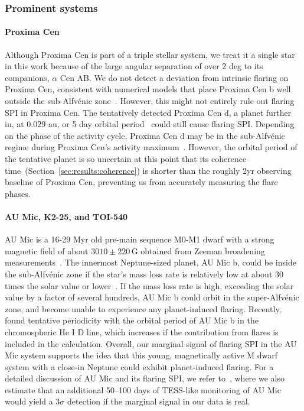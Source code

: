 \documentclass[twocolumn]{aastex631}
\begin{document}
\subsubsection{Prominent systems}
\label{sec:prominensystems}
\paragraph{Proxima Cen}
\label{sec:results:individualstars:proxima}
Although Proxima Cen is part of a triple stellar system, we treat it a single star in this work because of the large angular separation of over 2 deg to its companions, $\alpha$ Cen AB. We do not detect a deviation from intrinsic flaring on Proxima Cen, consistent with numerical models that place Proxima Cen b well outside the sub-Alfv\'enic zone~\citep{alvarado-gomez2020earthlike, kavanagh2021planetinduced, garraffo2022revisiting}. However, this might not entirely rule out flaring SPI in Proxima Cen. The tentatively detected Proxima Cen d, a planet further in, at 0.029 au, or 5 day orbital period~\citep{faria2022candidate, artigau2022linebyline} could still cause flaring SPI. Depending on the phase of the activity cycle, Proxima Cen d may be in the sub-Alfv\'enic regime during Proxima Cen's activity maximum~\citep{alvarado-gomez2020earthlike}. However, the orbital period of the tentative planet is so uncertain at this point that its coherence time~(Section~\ref{sec:results:coherence}) is shorter than the roughly 2yr observing baseline of Proxima Cen, preventing us from accurately measuring the flare phases. 


\paragraph{AU Mic, K2-25, and TOI-540}
\label{sec:results:individualstars:aumic}

AU Mic is a 16-29 Myr old pre-main sequence M0-M1 dwarf with a strong magnetic field of about $3010\pm220\,$G obtained from Zeeman broadening measurements~\citep{reiners2022magnetism}. The innermost Neptune-sized planet, AU Mic b, could be inside the sub-Alfv\'enic zone if the star's mass loss rate is relatively low at about 30 times the solar value or lower~\citep{alvarado-gomez2022simulating}. If the mass loss rate is high, exceeding the solar value by a factor of several hundreds, AU Mic b could orbit in the super-Alfv\'enic zone, and become unable to experience any planet-induced flaring. Recently, \citet{klein2022one} found tentative periodicity with the orbital period of AU Mic b in the chromospheric He I D line, which increases if the contribution from flares is included in the calculation. Overall, our marginal signal of flaring SPI in the AU Mic system supports the idea that this young, magnetically active M dwarf system with a close-in Neptune could exhibit planet-induced flaring.
For a detailed discussion of AU Mic and its flaring SPI, we refer to~\cite{ilin2022searching}, where we also estimate that an additional 50–100 days of TESS-like monitoring of AU Mic would yield a $3\sigma$ detection if the marginal signal in our data is real.
\end{document}
